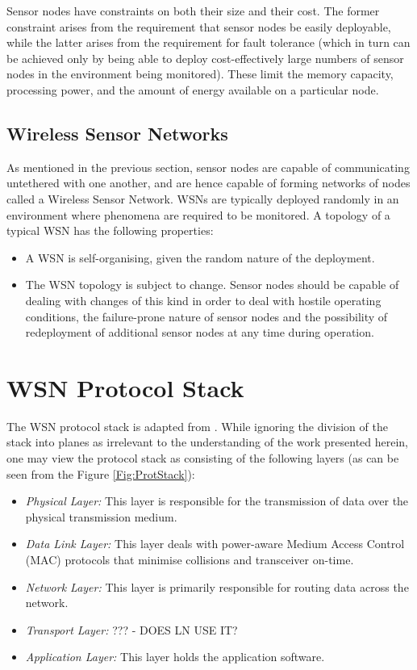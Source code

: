 Sensor nodes have constraints on both their size and their cost. The former 
constraint arises from the requirement that sensor nodes be easily deployable, 
while the latter arises from the requirement for fault tolerance (which in turn 
can be achieved only by being able to deploy cost-effectively large numbers of
sensor nodes in the environment being monitored). These limit the memory capacity, processing 
power, and the amount of energy available on a particular node.

\subsection{Wireless Sensor Networks}

As mentioned in the previous section, sensor nodes are capable of communicating 
untethered with one another, and are hence capable of forming networks of nodes 
called a Wireless Sensor Network. WSNs are typically deployed randomly in an
environment where phenomena are required to be monitored. A topology of a typical WSN has the 
following properties:

\begin{itemize}
\item A WSN is self-organising, given the random nature of the deployment.
\item The WSN topology is subject to change. Sensor nodes should be capable of 
dealing with changes of this kind in order to deal with hostile operating 
conditions, the failure-prone nature of sensor nodes and the possibility of 
redeployment of additional sensor nodes at any time during operation.
\end{itemize}

\section{WSN Protocol Stack} \label{sec:WSNProtStack}

The WSN protocol stack \cite{SensorSurveyAkyildiz:2002} is adapted from 
\cite{ComputerNetworksTannenbaum:2003}. While ignoring the division of the 
stack into planes as irrelevant to the understanding of the work presented 
herein, one may view the protocol stack as consisting of the following layers
(as can be seen from the Figure \ref{Fig:ProtStack}):

\begin{itemize}
\item \emph{Physical Layer:} This layer is responsible for the transmission of 
data over the physical transmission medium.
\item \emph{Data Link Layer:} This layer deals with power-aware Medium Access 
Control (MAC) protocols that minimise collisions and transceiver on-time.
\item \emph{Network Layer:} This layer is primarily responsible for routing  
data across the network.
\item \emph{Transport Layer:} ??? - DOES LN USE IT?
\item \emph{Application Layer:} This layer holds the application software.
\end{itemize}

